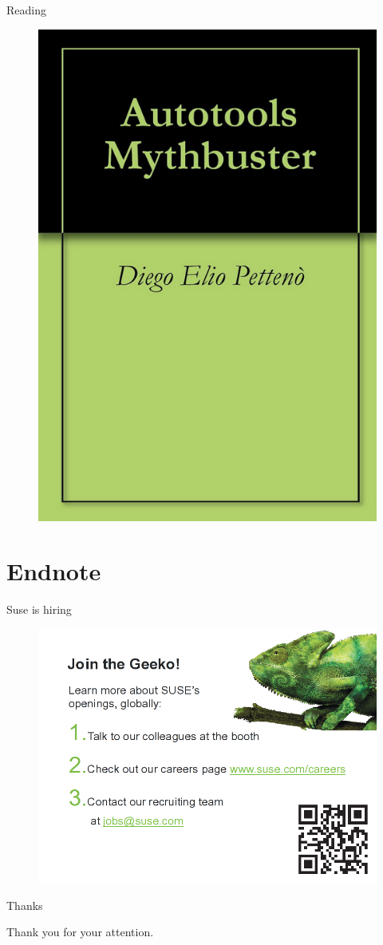 \documentclass{beamer}
\begin{document}
\begin{frame}{Reading}
	\begin{figure}
	\includegraphics[width= 0.4\linewidth]{mythbuster.png}
	\end{figure}
\end{frame}

\section{Endnote}

\begin{frame}{Suse is hiring}
	\begin{figure}
	\includegraphics[width= 0.8\linewidth]{suse_hiring.png}
	\end{figure}
\end{frame}

\begin{frame}{Thanks}
	\begin{center}
	Thank you for your attention.
	\end{center}
\end{frame}
\end{document}
